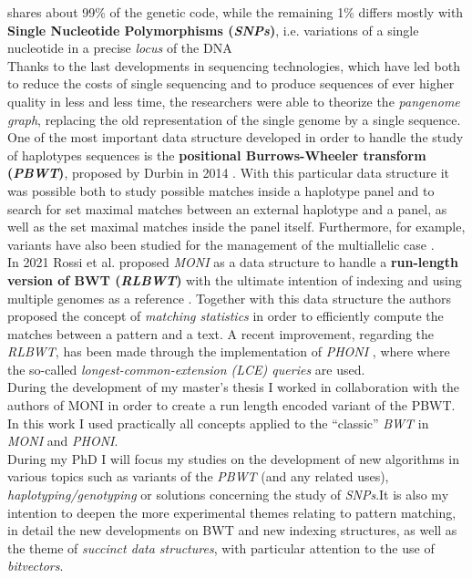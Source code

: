 \documentclass[a4paper,11pt, oneside]{article}
\begin{document}
shares about 99\% of the genetic code, while the remaining 1\% differs mostly
with \textbf{Single Nucleotide Polymorphisms (\textit{SNPs})}, i.e. variations
of a single nucleotide in a precise \textit{locus} of the DNA\\ 
Thanks to the last developments in sequencing technologies, which have led both
to reduce the costs of single sequencing and to produce sequences of ever higher
quality in less and less time, the researchers were able to theorize the
\textit{pangenome graph}, replacing the old representation of the single genome
by a single sequence. \\
One of the most important data structure developed in order to handle the study
of haplotypes sequences is the \textbf{positional Burrows-Wheeler transform
  (\textit{PBWT})}, proposed by Durbin in 2014 \cite{pbwt_durbin}. With this
particular data structure it was possible both to study possible matches inside
a haplotype panel and to search for set maximal matches between an external
haplotype and a panel, as well as the set maximal matches inside the panel
itself. Furthermore, for example, variants have also been studied for the 
management of the multiallelic case
. \\
In 2021 Rossi et al. proposed \textit{MONI} as a data structure to handle a
\textbf{run-length version of BWT (\textit{RLBWT})} with the ultimate intention
of indexing and using multiple genomes as a reference \cite{moni}. Together with
this data structure the authors proposed the concept of \textit{matching
  statistics} in order to efficiently compute the matches between a pattern and
a text. A recent improvement, regarding the \textit{RLBWT}, has been made
through the implementation of \textit{PHONI} \cite{phoni}, where where the
so-called \textit{longest-common-extension (LCE) queries} are used. \\
During the development of my master's thesis I worked in collaboration with the
authors of MONI in order to create a run length encoded variant of the PBWT. In
this work I used practically all concepts applied to the ``classic''
\textit{BWT} in \textit{MONI} and \textit{PHONI}. \\
During my PhD I will focus my studies on the development of new algorithms in
various topics such as variants of the \textit{PBWT} (and any related uses),
\textit{haplotyping/genotyping} or solutions concerning the study of
\textit{SNPs}.It is also my intention to deepen the more experimental themes
relating to pattern matching, in detail the new developments on BWT and new
indexing structures, as well as the theme of \textit{succinct data structures},
with particular attention to the use of \textit{bitvectors}. 
\end{document}
